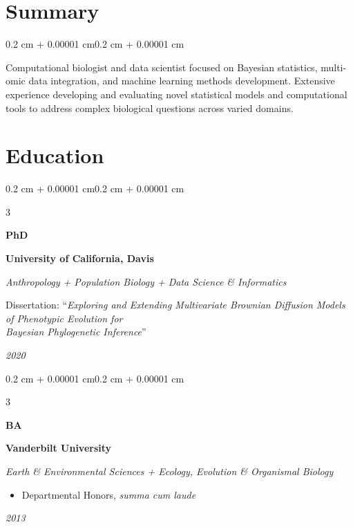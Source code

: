 \documentclass[10pt, letterpaper]{article}
\newenvironment{highlights}{
    \begin{itemize}[
        topsep=0.05 cm, %
        parsep=0.05 cm, %
        partopsep=0pt,
        itemsep=0pt,
        leftmargin=0.4 cm + 10pt, %
        label=\textbf{--} %
    ]
}{
    \end{itemize}
}
\newenvironment{onecolentry}{
    \begin{adjustwidth}{0.2 cm + 0.00001 cm}{0.2 cm + 0.00001 cm}
}{
    \end{adjustwidth}
}
\newenvironment{threecolentry}[3][]{ %
    \onecolentry
    \def\thirdColumn{#3}
    \setcolumnwidth{0.5 cm, \fill, 1.0 cm} %
    \begin{paracol}{3}
    {\raggedright \textbf{#2}} \switchcolumn %
}{
    \switchcolumn \raggedleft \thirdColumn
    \end{paracol}
    \endonecolentry
}
\begin{document}
    \vspace{-0.5 cm} %

    \section{Summary}
        \begin{onecolentry}
            Computational biologist and data scientist focused on Bayesian statistics, multi-omic data integration, and machine learning methods development. Extensive experience developing and evaluating novel statistical models and computational tools to address complex biological questions across varied domains.
        \end{onecolentry}

    \section{Education}
        \begin{threecolentry}{PhD}{
            \textit{\textcolor{primaryColor}{2020}} %
        } %
            \textbf{University of California, Davis}
            \par\vspace{0.05cm}
            \textit{Anthropology + Population Biology + Data Science \& Informatics}
            \par\vspace{0.05cm}
            Dissertation: ``\textit{Exploring and Extending Multivariate Brownian Diffusion Models of Phenotypic Evolution for}\\
            \hspace*{10.5cm}\textit{Bayesian Phylogenetic Inference}''
        \end{threecolentry}

        \vspace{-0.5 cm}

        \begin{threecolentry}{BA}{
             \textit{\textcolor{primaryColor}{2013}}
        }
            \textbf{Vanderbilt University}
            \par\vspace{0.05cm}
            \textit{Earth & Environmental Sciences + Ecology, Evolution \& Organismal Biology}
            \begin{highlights} %
                \item Departmental Honors, \textit{summa cum laude}
            \end{highlights}
        \end{threecolentry}
    
\end{document}
